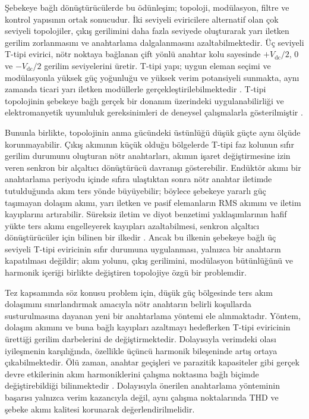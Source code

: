 Şebekeye bağlı dönüştürücülerde bu ödünleşim; topoloji, modülasyon, filtre ve kontrol yapısının ortak sonucudur. İki seviyeli eviricilere alternatif olan çok seviyeli topolojiler, çıkış gerilimini daha fazla seviyede oluşturarak yarı iletken gerilim zorlanmasını ve anahtarlama dalgalanmasını azaltabilmektedir. Üç seviyeli T-tipi evirici, nötr noktaya bağlanan çift yönlü anahtar kolu sayesinde $+V_{\mathrm{dc}}/2$, $0$ ve $-V_{\mathrm{dc}}/2$ gerilim seviyelerini üretir. T-tipi yapı; uygun eleman seçimi ve modülasyonla yüksek güç yoğunluğu ve yüksek verim potansiyeli sunmakta, aynı zamanda ticari yarı iletken modüllerle gerçekleştirilebilmektedir \citep{Wang2020}. T-tipi topolojinin şebekeye bağlı gerçek bir donanım üzerindeki uygulanabilirliği ve elektromanyetik uyumluluk gereksinimleri de deneysel çalışmalarla gösterilmiştir \citep{Hizarci2021}.

Bununla birlikte, topolojinin anma gücündeki üstünlüğü düşük güçte aynı ölçüde korunmayabilir. Çıkış akımının küçük olduğu bölgelerde T-tipi faz kolunun sıfır gerilim durumunu oluşturan nötr anahtarları, akımın işaret değiştirmesine izin veren senkron bir alçaltıcı dönüştürücü davranışı gösterebilir. Endüktör akımı bir anahtarlama periyodu içinde sıfıra ulaştıktan sonra nötr anahtar iletimde tutulduğunda akım ters yönde büyüyebilir; böylece şebekeye yararlı güç taşımayan dolaşım akımı, yarı iletken ve pasif elemanların RMS akımını ve iletim kayıplarını artırabilir. Süreksiz iletim ve diyot benzetimi yaklaşımlarının hafif yükte ters akımı engelleyerek kayıpları azaltabilmesi, senkron alçaltıcı dönüştürücüler için bilinen bir ilkedir \citep{Erickson2001,Mohan2003,Chen2010}. Ancak bu ilkenin şebekeye bağlı üç seviyeli T-tipi eviricinin sıfır durumuna uygulanması, yalnızca bir anahtarın kapatılması değildir; akım yolunu, çıkış gerilimini, modülasyon bütünlüğünü ve harmonik içeriği birlikte değiştiren topolojiye özgü bir problemdir.

Tez kapsamında söz konusu problem için, düşük güç bölgesinde ters akım dolaşımını sınırlandırmak amacıyla nötr anahtarın belirli koşullarda susturulmasına dayanan yeni bir anahtarlama yöntemi ele alınmaktadır. Yöntem, dolaşım akımını ve buna bağlı kayıpları azaltmayı hedeflerken T-tipi eviricinin ürettiği gerilim darbelerini de değiştirmektedir. Dolayısıyla verimdeki olası iyileşmenin karşılığında, özellikle üçüncü harmonik bileşeninde artış ortaya çıkabilmektedir. Ölü zaman, anahtar geçişleri ve parazitik kapasiteler gibi gerçek devre etkilerinin akım harmoniklerini çalışma noktasına bağlı biçimde değiştirebildiği bilinmektedir \citep{Zhang2014Deadtime}. Dolayısıyla önerilen anahtarlama yönteminin başarısı yalnızca verim kazancıyla değil, aynı çalışma noktalarında THD ve şebeke akımı kalitesi korunarak değerlendirilmelidir.

